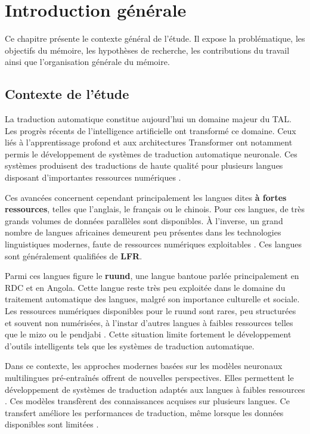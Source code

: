 \chapter{Introduction générale}

Ce chapitre présente le contexte général de l'étude. Il expose la problématique, les objectifs du mémoire, les hypothèses de recherche, les contributions du travail ainsi que l'organisation générale du mémoire.

\section{Contexte de l'étude}

La traduction automatique constitue aujourd'hui un domaine majeur du \ac{TAL}. Les progrès récents de l'intelligence artificielle ont transformé ce domaine. Ceux liés à l'apprentissage profond et aux architectures Transformer \cite{vaswani2017attention} ont notamment permis le développement de systèmes de traduction automatique neuronale. Ces systèmes produisent des traductions de haute qualité pour plusieurs langues disposant d'importantes ressources numériques \cite{ranathunga2023neural}.

Ces avancées concernent cependant principalement les langues dites \textbf{à fortes ressources}, telles que l'anglais, le français ou le chinois. Pour ces langues, de très grands volumes de données parallèles sont disponibles. À l'inverse, un grand nombre de langues africaines demeurent peu présentes dans les technologies linguistiques modernes, faute de ressources numériques exploitables \cite{agyei2024low, ranathunga2023neural}. Ces langues sont généralement qualifiées de \textbf{\ac{LFR}}.

Parmi ces langues figure le \textbf{ruund}, une langue bantoue parlée principalement en \ac{RDC} et en Angola. Cette langue reste très peu exploitée dans le domaine du traitement automatique des langues, malgré son importance culturelle et sociale. Les ressources numériques disponibles pour le ruund sont rares, peu structurées et souvent non numérisées, à l'instar d'autres langues à faibles ressources telles que le mizo \cite{haulai2023construction} ou le pendjabi \cite{jindal2017building}. Cette situation limite fortement le développement d'outils intelligents tels que les systèmes de traduction automatique.

Dans ce contexte, les approches modernes basées sur les modèles neuronaux multilingues pré-entraînés offrent de nouvelles perspectives. Elles permettent le développement de systèmes de traduction adaptés aux langues à faibles ressources \cite{kozhirbayev2024enhancing, lalrempuii2023investigating}. Ces modèles transfèrent des connaissances acquises sur plusieurs langues. Ce transfert améliore les performances de traduction, même lorsque les données disponibles sont limitées \cite{nguyen2017transfer, ma2025dongba}.


